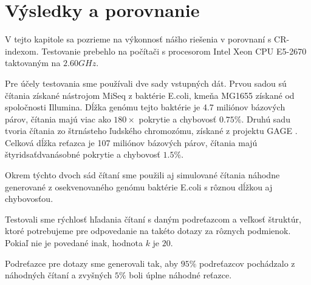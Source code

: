\chapter{Výsledky a porovnanie}

V tejto kapitole sa pozrieme na výkonnosť nášho riešenia v porovnaní
s CR-indexom. Testovanie prebehlo na počítači s procesorom
Intel Xeon CPU E5-2670 taktovaným na $2.60 GHz$.

Pre účely testovania sme používali dve sady vstupných dát. Prvou sadou sú
čítania získané nástrojom MiSeq z baktérie E.coli, kmeňa MG1655
získané od spoločnosti Illumina. Dĺžka genómu tejto baktérie je 4.7 miliónov bázových párov, čítania
majú viac ako $180\times$ pokrytie a chybovosť $0.75\%$. Druhú sadu tvoria čítania zo štrnásteho ľudského
chromozómu, získané z projektu GAGE \cite{gage}. Celková dĺžka reťazca je 107 miliónov bázových párov,
čítania majú štyridsaťdvanásobné pokrytie a chybovosť $1.5\%$.

Okrem týchto dvoch sád čítaní sme použili aj simulované čítania náhodne generované z osekvenovaného
genómu baktérie E.coli s rôznou dĺžkou aj chybovosťou.

Testovali sme rýchlosť hľadania čítaní s daným podreťazcom a veľkosť štruktúr, ktoré potrebujeme pre odpovedanie
na takéto dotazy za rôznych podmienok. Pokiaľ nie je povedané inak, hodnota $k$ je $20$.

Podreťazce pre dotazy sme generovali tak, aby $95\%$ podreťazcov
pochádzalo z náhodných čítaní a zvyšných $5\%$ boli úplne náhodné reťazce.

